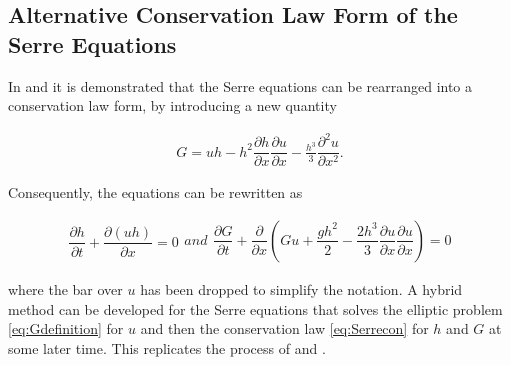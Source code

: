 \documentclass[SingleSpace,12pt,Proceedings]{Serre_ASCE}
\begin{document}
\subsection{Alternative Conservation Law Form of the Serre Equations}
\label{section:Alternative Conservation Law Form of the Serre Equations}
In  and  it is demonstrated that the Serre equations can be rearranged into a conservation law form, by introducing a new quantity
\begin{linenomath*}
\begin{gather}
\label{eq:Gdefinition}
G = uh - h^2 \dfrac{\partial h}{\partial x} \dfrac{\partial u}{\partial x} - \frac{h^3}{3} \dfrac{\partial^2 u}{\partial x^2}.
\end{gather}
\end{linenomath*}
Consequently, the equations can be rewritten as
\begin{linenomath*}
\begin{subequations}
\begin{gather}
\dfrac{\partial h}{\partial t} + \dfrac{\partial (uh)}{\partial x} = 0
\label{eq:Serrecon_continuity}
\end{gather}
and
\begin{gather}
\dfrac{\partial G}{\partial t} + \dfrac{\partial}{\partial x}\left(Gu + \dfrac{gh^2}{2} - \dfrac{2h^3}{3}\dfrac{\partial u}{\partial x}\dfrac{\partial u}{\partial x}\right) = 0
\label{eq:Serrecon_momentum}
\end{gather}
\label{eq:Serrecon}
\end{subequations}
\end{linenomath*}
where the bar over $u$ has been dropped to simplify the notation. A hybrid method can be developed for the Serre equations that solves the elliptic problem \eqref{eq:Gdefinition} for $u$ and then the conservation law \eqref{eq:Serrecon} for $h$ and $G$ at some later time. This replicates the process of  and .
\end{document}
